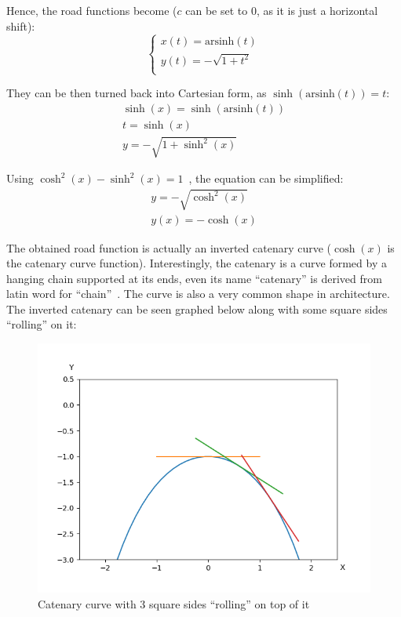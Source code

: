\documentclass[12pt]{article}
\begin{document}
        Hence, the road functions become ($c$ can be set to $0$, as it is just a horizontal shift):
        \begin{equation}\label{eq:road_2}
            \begin{cases}
                x(t) = \text{arsinh}(t) \\
                y(t) = -\sqrt{1+t^2} \\
            \end{cases}
        \end{equation}

        They can be then turned back into Cartesian form, as $\sinh(\text{arsinh}(t)) = t$:
        \begin{align}
            \sinh(x) = \sinh(\text{arsinh}(t)) \\
            t = \sinh(x) \\
            y = -\sqrt{1+\sinh^2(x)}
        \end{align}

        Using $\cosh^2(x) - \sinh^2(x) = 1$~\cite{oxford_dict}, the equation can be simplified:
        \begin{align}
            y = -\sqrt{\cosh^2(x)} \\
            y(x) = -\cosh(x)
        \end{align}

        The obtained road function is actually an inverted catenary curve ($\cosh(x)$ is the catenary curve function). Interestingly, the catenary is a curve formed by a hanging chain supported at its ends, even its name ``catenary'' is derived from latin word for ``chain''~\cite{mathworld_catenary}. The curve is also a very common shape in architecture. The inverted catenary can be seen graphed below along with some square sides ``rolling'' on it:
        
        \begin{figure}[H]
            \centering
            \includegraphics[width=0.75\linewidth]{images/cosh_many.png}
            \caption[Catenary curve with 3 square sides]{Catenary curve with 3 square sides ``rolling'' on top of it\footnotemark}\label{fig:cosh}
        \end{figure}
\end{document}
